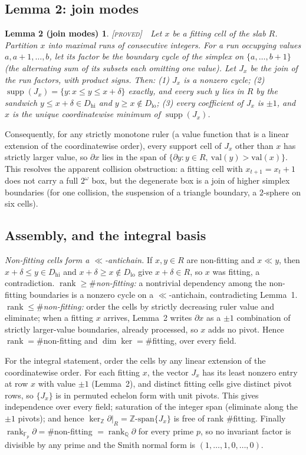 \documentclass[11pt,reqno]{amsart}
\theoremstyle{plain}
\theoremstyle{definition}
\theoremstyle{plain}
\newtheorem*{lemJM}{Lemma 2 (join modes)}
\newcommand{\rank}{\operatorname{rank}}
\newcommand{\Z}{\mathbb{Z}}
\newcommand{\Q}{\mathbb{Q}}
\newcommand{\F}{\mathbb{F}}
\newcommand{\dd}{\delta}
\newcommand{\st}{\textsc}
\begin{document}
\subsection{Lemma 2: join modes}
\begin{lemJM}
\textnormal{\st{[proved]}}\ \ Let $x$ be a fitting cell of the slab $R$. Partition $x$ into
maximal runs of consecutive integers. For a run occupying values $a,a+1,\dots,b$, let its
factor be the boundary cycle of the simplex on $\{a,\dots,b+1\}$ (the alternating sum of its
subsets each omitting one value). Let $J_x$ be the join of the run factors, with product
signs. Then: \emph{(1)} $J_x$ is a nonzero cycle; \emph{(2)}
$\operatorname{supp}(J_x)=\{y: x\le y\le x+\dd\}$ exactly, and every such $y$ lies in $R$ by
the sandwich $y\le x+\dd\in D_{\mathrm{hi}}$ and $y\ge x\notin D_{\mathrm{lo}}$; \emph{(3)}
every coefficient of $J_x$ is $\pm1$, and $x$ is the unique coordinatewise minimum of
$\operatorname{supp}(J_x)$.
\end{lemJM}
Consequently, for any strictly monotone ruler (a value function that is a linear extension of
the coordinatewise order), every support cell of $J_x$ other than $x$ has strictly larger
value, so $\partial x$ lies in the span of $\{\partial y: y\in R,\ \mathrm{val}(y)>\mathrm{val}(x)\}$.
This resolves the apparent collision obstruction: a fitting cell with $x_{t+1}=x_t+1$ does not
carry a full $2^\omega$ box, but the degenerate box is a join of higher simplex boundaries (for
one collision, the suspension of a triangle boundary, a $2$-sphere on six cells).

\subsection{Assembly, and the integral basis}\label{sec:assembly}
\emph{Non-fitting cells form a $\ll$-antichain.} If $x,y\in R$ are non-fitting and $x\ll y$,
then $x+\dd\le y\in D_{\mathrm{hi}}$ and $x+\dd\ge x\notin D_{\mathrm{lo}}$ give $x+\dd\in R$, so
$x$ was fitting, a contradiction. \emph{$\rank\ge\#$non-fitting:} a nontrivial dependency among
the non-fitting boundaries is a nonzero cycle on a $\ll$-antichain, contradicting Lemma~1.
\emph{$\rank\le\#$non-fitting:} order the cells by strictly decreasing ruler value and
eliminate; when a fitting $x$ arrives, Lemma~2 writes $\partial x$ as a $\pm1$ combination of
strictly larger-value boundaries, already processed, so $x$ adds no pivot. Hence
$\rank=\#$non-fitting and $\dim\ker=\#$fitting, over every field.

For the integral statement, order the cells by any linear extension of the coordinatewise
order. For each fitting $x$, the vector $J_x$ has its least nonzero entry at row $x$ with value
$\pm1$ (Lemma~2), and distinct fitting cells give distinct pivot rows, so $\{J_x\}$ is in
permuted echelon form with unit pivots. This gives independence over every field; saturation of
the integer span (eliminate along the $\pm1$ pivots); and hence
$\ker_{\Z}\partial|_R=\Z\text{-span}\{J_x\}$ is free of rank $\#$fitting. Finally
$\rank_{\F_p}\partial=\#$non-fitting $=\rank_{\Q}\partial$ for every prime $p$, so no invariant
factor is divisible by any prime and the Smith normal form is $(1,\dots,1,0,\dots,0)$.
\end{document}

